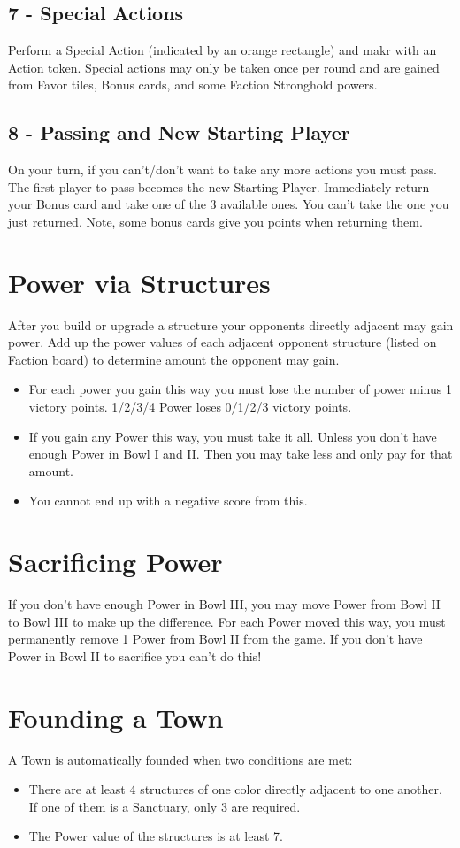 \documentclass[12pt]{article}
\newenvironment{itemizeCustom}
{\begin{itemize}
  \setlength{\itemsep}{1pt}
  \setlength{\parskip}{0pt}
  \setlength{\parsep}{0pt}}
{\end{itemize}}
\begin{document}
\begin{multicols*}{2}
\subsection*{7 - Special Actions}
Perform a Special Action (indicated by an orange rectangle) and makr with an Action token. Special actions may only be taken once per round and are gained from Favor tiles, Bonus cards, and some Faction Stronghold powers.

\subsection*{8 - Passing and New Starting Player}
On your turn, if you can't/don't want to take any more actions you must pass. The first player to pass becomes the new Starting Player. Immediately return your Bonus card and take one of the 3 available ones. You can't take the one you just returned. Note, some bonus cards give you points when returning them.

\section*{Power via Structures}
After you build or upgrade a structure your opponents directly adjacent may gain power. Add up the power values of each adjacent opponent structure (listed on Faction board) to determine amount the opponent may gain.
\begin{itemizeCustom}
    \item For each power you gain this way you must lose the number of power minus 1 victory points. 1/2/3/4 Power loses 0/1/2/3 victory points.
    \item If you gain any Power this way, you must take it all. Unless you don't have enough Power in Bowl I and II. Then you may take less and only pay for that amount.
    \item You cannot end up with a negative score from this.
\end{itemizeCustom}

\section*{Sacrificing Power}
If you don't have enough Power in Bowl III, you may move Power from Bowl II to Bowl III to make up the difference. For each Power moved this way, you must permanently remove 1 Power from Bowl II from the game. If you don't have Power in Bowl II to sacrifice you can't do this!

\section*{Founding a Town}
A Town is automatically founded when two conditions are met:
\begin{itemizeCustom}
    \item There are at least 4 structures of one color directly adjacent to one another. If one of them is a Sanctuary, only 3 are required.
    \item The Power value of the structures is at least 7.
\end{itemizeCustom}


\end{multicols*}
\end{document}
